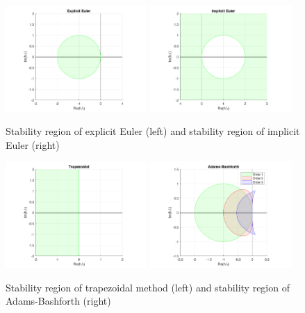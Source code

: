 \documentclass{digitaldynamics}
\begin{document}
\begin{itemize}
	\begin{figure}[ht]
		\centering
			\includegraphics[width=0.48\textwidth]{stability_euler.png}
			\includegraphics[width=0.48\textwidth]{stability_ieuler.png}
		\caption{Stability region of explicit Euler (left) and stability region of implicit Euler (right)}
		\label{fig:stability_euler}
	\end{figure}
	\begin{figure}[ht]
		\centering
			\includegraphics[width=0.48\textwidth]{stability_trapezoidal.png}
			\includegraphics[width=0.48\textwidth]{stability_adams.png}
		\caption{Stability region of trapezoidal method (left) and stability region of Adams-Bashforth (right)}

\end{figure}
\end{itemize}
\end{document}
